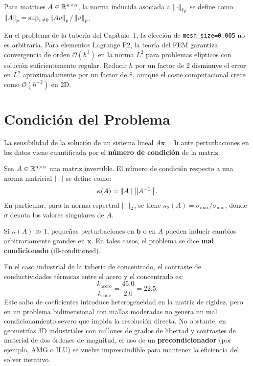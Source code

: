 Para matrices $A \in \mathbb{R}^{n \times n}$, la norma inducida asociada a $\left\lVert\cdot\right\rVert_{\ell_p}$ se define como $\left\lVert A\right\rVert_p = \sup_{v \neq 0} \left\lVert Av\right\rVert_p / \left\lVert v\right\rVert_p$.

\begin{notatecnica}
En el problema de la tubería del Capítulo~1, la elección de \texttt{mesh\_size=0.005} no es arbitraria. Para elementos Lagrange P2, la teoría del FEM garantiza convergencia de orden $\mathcal{O}(h^3)$ en la norma $L^2$ para problemas elípticos con solución suficientemente regular. Reducir $h$ por un factor de 2 disminuye el error en $L^2$ aproximadamente por un factor de 8, aunque el coste computacional crece como $\mathcal{O}(h^{-2})$ en 2D.
\end{notatecnica}

\section{Condición del Problema}

La sensibilidad de la solución de un sistema lineal $A\bm{x} = \bm{b}$ ante perturbaciones en los datos viene cuantificada por el \textbf{número de condición} de la matriz.

\begin{definicion}
    Sea $A \in \mathbb{R}^{n \times n}$ una matriz invertible. El número de condición respecto a una norma matricial $\left\lVert\cdot\right\rVert$ se define como:
    \begin{equation}
        \kappa(A) = \left\lVert A\right\rVert \, \left\lVert A^{-1}\right\rVert.
    \end{equation}
    En particular, para la norma espectral $\left\lVert\cdot\right\rVert_2$, se tiene $\kappa_2(A) = \sigma_{\max} / \sigma_{\min}$, donde $\sigma$ denota los valores singulares de $A$.
\end{definicion}

Si $\kappa(A) \gg 1$, pequeñas perturbaciones en $\bm{b}$ o en $A$ pueden inducir cambios arbitrariamente grandes en $\bm{x}$. En tales casos, el problema se dice \textbf{mal condicionado} (ill-conditioned).

En el caso industrial de la tubería de concentrado, el contraste de conductividades térmicas entre el acero y el concentrado es:
\begin{equation}
    \frac{k_{\text{acero}}}{k_{\text{conc}}} = \frac{45.0}{2.0} = 22.5.
\end{equation}
Este salto de coeficientes introduce heterogeneidad en la matriz de rigidez, pero en un problema bidimensional con mallas moderadas no genera un mal condicionamiento severo que impida la resolución directa. No obstante, en geometrías 3D industriales con millones de grados de libertad y contrastes de material de dos órdenes de magnitud, el uso de un \textbf{precondicionador} (por ejemplo, AMG o ILU) se vuelve imprescindible para mantener la eficiencia del solver iterativo.

